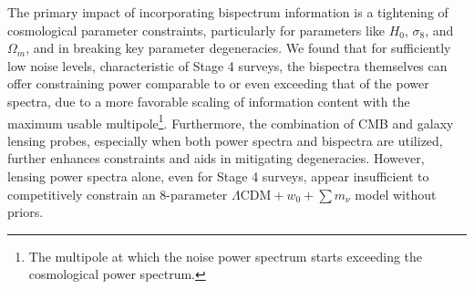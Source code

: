 \documentclass[11pt]{article} %
\begin{document}
The primary impact of incorporating bispectrum information is a tightening of cosmological parameter constraints, particularly for parameters like $H_0$, $\sigma_8$, and $\Omega_m$, and in breaking key parameter degeneracies. We found that for sufficiently low noise levels, characteristic of Stage 4 surveys, the bispectra themselves can offer constraining power comparable to or even exceeding that of the power spectra, due to a more favorable scaling of information content with the maximum usable multipole\footnote{The multipole at which the noise power spectrum starts exceeding the cosmological power spectrum.}. Furthermore, the combination of CMB and galaxy lensing probes, especially when both power spectra and bispectra are utilized, further enhances constraints and aids in mitigating degeneracies. However, lensing power spectra alone, even for Stage 4 surveys, appear insufficient to competitively constrain an 8-parameter $\Lambda\text{CDM} + w_0 + \sum m_\nu$ model without priors.
\end{document}

